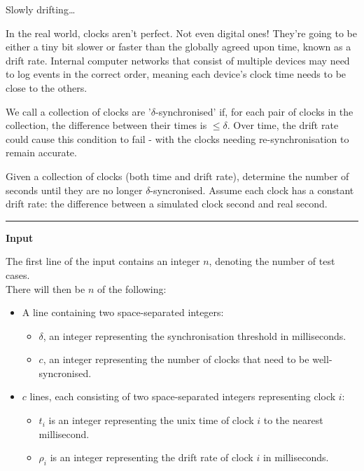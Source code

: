 \togglefalse{IsScore}
{Slowly drifting\dots}

In the real world, clocks aren't perfect. 
Not even digital ones!
They're going to be either a tiny bit slower or faster than the globally agreed upon time, known as a drift rate.
Internal computer networks that consist of multiple devices may need to log events in the correct order, meaning each device's clock time needs to be close to the others.

We call a collection of clocks are '$\delta$-synchronised' if, for each pair of clocks in the collection, the difference between their times is $\leq \delta$.
Over time, the drift rate could cause this condition to fail - with the clocks needing re-synchronisation to remain accurate.

Given a collection of clocks (both time and drift rate), determine the number of seconds until they are no longer $\delta$-syncronised.
Assume each clock has a constant drift rate: the difference between a simulated clock second and real second.

\vspace{8pt}
\hrule

\textbf{Input}

The first line of the input contains an integer $n$, denoting the number of test cases. \\
There will then be $n$ of the following:
\begin{itemize}
    \item A line containing two space-separated integers:
    \begin{itemize}
        \item $\delta$, an integer representing the synchronisation threshold in milliseconds.
        \item $c$, an integer representing the number of clocks that need to be well-syncronised.
    \end{itemize}
    \item $c$ lines, each consisting of two space-separated integers representing clock $i$:
    \begin{itemize}
        \item $t_i$ is an integer representing the unix time of clock $i$ to the nearest millisecond.
        \item $\rho_i$ is an integer representing the drift rate of clock $i$ in milliseconds.
    \end{itemize}
\end{itemize}

